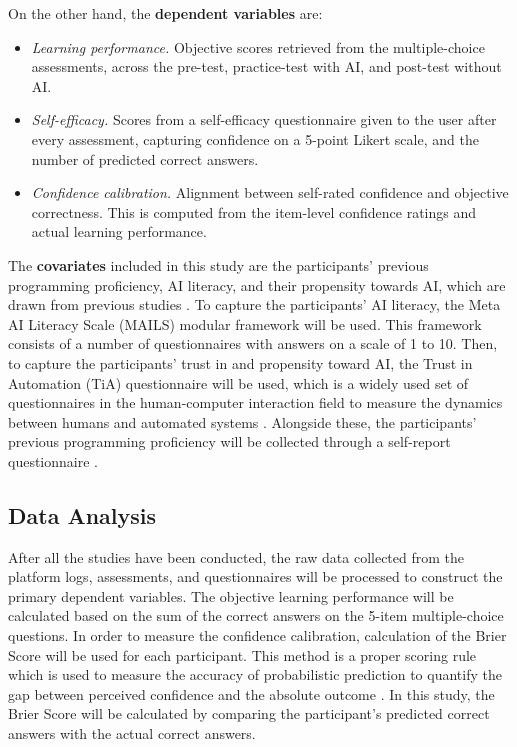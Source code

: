 \documentclass{article}
\begin{document}
On the other hand, the \textbf{dependent variables} are:
\begin{itemize}
  \item \emph{Learning performance.} Objective scores retrieved from the multiple-choice assessments, 
  across the pre-test, practice-test with AI, and post-test without AI.
  \item \emph{Self-efficacy.} Scores from a self-efficacy 
  questionnaire given to the user after every assessment, capturing confidence 
  on a 5-point Likert scale, and the number of predicted correct answers.
  \item \emph{Confidence calibration.} Alignment between self-rated confidence 
  and objective correctness. This is computed from the item-level confidence ratings 
  and actual learning performance. 
\end{itemize}

The \textbf{covariates} included in this study are the participants' previous programming proficiency, AI literacy, 
and their propensity towards AI, which are drawn from previous studies \cite{Bastani2025,Jin2025,KimetAl2026}.
To capture the participants' AI literacy, 
the Meta AI Literacy Scale (MAILS) \cite{MAILS2023} modular framework will be used. This 
framework consists of a number of questionnaires with answers on a scale of 1 to 10. Then, to 
capture the participants' trust in and propensity toward AI, the Trust in Automation (TiA) 
questionnaire will be used, which is a widely used set of questionnaires in the human-computer interaction field 
to measure the dynamics between humans and automated systems \cite{TiA}. Alongside these, 
the participants' previous programming proficiency will be collected through 
a self-report questionnaire \cite{Feigenspan2012}.

\subsection{Data Analysis}
After all the studies have been conducted, the raw data collected from the 
platform logs, assessments, and questionnaires will be processed to construct the 
primary dependent variables.
The objective learning performance will be calculated based on the 
sum of the correct answers on the 5-item multiple-choice questions. 
In order to measure the confidence calibration, calculation of the 
Brier Score \cite{Brier2025} will be used for each participant. 
This method is a proper scoring rule which is used to measure the 
accuracy of probabilistic prediction to quantify the gap between perceived confidence 
and the absolute outcome \cite{Brier2025}. In this study, the Brier Score will be 
calculated by comparing the participant's 
predicted correct answers with the actual correct answers.
\end{document}
